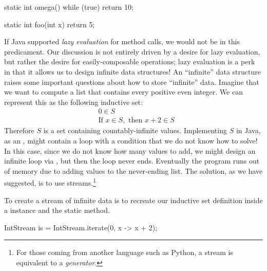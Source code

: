 \begin{verbnobox}[\small]
static int omega() {
  while (true) {}
  return 10;
}
\end{verbnobox}
\begin{verbnobox}[\small]
static int foo(int x) {
  return 5;
}
\end{verbnobox}

If Java supported \textit{lazy evaluation} for method calls, we would not be in this predicament. Our discussion is not entirely driven by a desire for lazy evaluation, but rather the desire for easily-composable operations; lazy evaluation is a perk in that it allows us to design infinite data structures! An ``infinite'' data structure raises some important questions about how to store ``infinite'' data. Imagine that we want to compute a list that contains every positive even integer. We can represent this as the following inductive set:
\begin{align*}
    &0 \in S\\
    &\text{If } x \in S,\text{ then }x + 2 \in S
\end{align*}
Therefore $S$ is a set containing countably-infinite values. Implementing $S$ in Java, as an , might contain a  loop with a condition that we do not know how to solve! In this case, since we do not know how many values to add, we might design an infinite loop via , but then the loop never ends. Eventually the program runs out of memory due to adding values to the never-ending list. The solution, as we have suggested, is to use streams.\footnote{For those coming from another language such as Python, a stream is equivalent to a \textit{generator}.}

To create a stream of infinite data is to recreate our inductive set definition inside a  instance and the  static method.

\begin{verbnobox}[\small]
IntStream is = IntStream.iterate(0, x -> x + 2);
\end{verbnobox}

